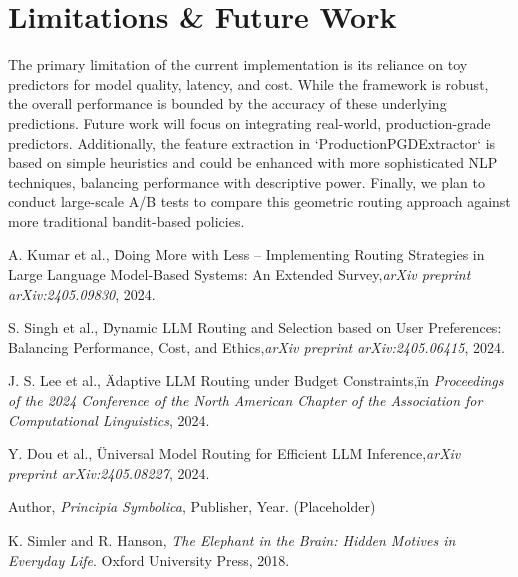 \documentclass[11pt]{article}
\begin{document}
\section{Limitations \& Future Work}
\label{sec:limitations}
The primary limitation of the current implementation is its reliance on toy predictors for model quality, latency, and cost. While the framework is robust, the overall performance is bounded by the accuracy of these underlying predictions. Future work will focus on integrating real-world, production-grade predictors. Additionally, the feature extraction in `ProductionPGDExtractor` is based on simple heuristics and could be enhanced with more sophisticated NLP techniques, balancing performance with descriptive power. Finally, we plan to conduct large-scale A/B tests to compare this geometric routing approach against more traditional bandit-based policies.

\begin{thebibliography}{9}
A. Kumar et al., \"Doing More with Less -- Implementing Routing Strategies in Large Language Model-Based Systems: An Extended Survey,\" \textit{arXiv preprint arXiv:2405.09830}, 2024.

S. Singh et al., \"Dynamic LLM Routing and Selection based on User Preferences: Balancing Performance, Cost, and Ethics,\" \textit{arXiv preprint arXiv:2405.06415}, 2024.

J. S. Lee et al., \"Adaptive LLM Routing under Budget Constraints,\" in \textit{Proceedings of the 2024 Conference of the North American Chapter of the Association for Computational Linguistics}, 2024.

Y. Dou et al., \"Universal Model Routing for Efficient LLM Inference,\" \textit{arXiv preprint arXiv:2405.08227}, 2024.

Author, \textit{Principia Symbolica}, Publisher, Year. (Placeholder)

K. Simler and R. Hanson, \textit{The Elephant in the Brain: Hidden Motives in Everyday Life}. Oxford University Press, 2018.

\end{thebibliography}
\end{document}
